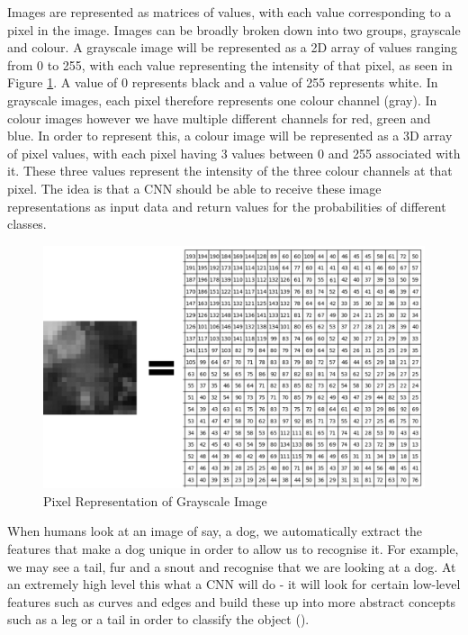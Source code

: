 \documentclass[12pt]{report}
\begin{document}
\begin{flushleft}
Images are represented as matrices of values, with each value corresponding to a pixel in the image. Images can be broadly broken down into two groups, grayscale and colour. A grayscale image will be represented as a 2D array of values ranging from 0 to 255, with each value representing the intensity of that pixel, as seen in Figure \ref{fig:pixels}. A value of 0 represents black and a value of 255 represents white. In grayscale images, each pixel therefore represents one colour channel (gray). In colour images however we have multiple different channels for red, green and blue. In order to represent this, a colour image will be represented as a 3D array of pixel values, with each pixel having 3 values between 0 and 255 associated with it. These three values represent the intensity of the three colour channels at that pixel. The idea is that a CNN should be able to receive these image representations as input data and return values for the probabilities of different classes.
\end{flushleft}

\vspace{0.5cm}
\begin{figure}[ht!]
	\centering
	\includegraphics[width=12cm]{pixels}
	\caption{Pixel Representation of Grayscale Image}
	\label{fig:pixels}
\end{figure}

\begin{flushleft}
When humans look at an image of say, a dog, we automatically extract the features that make a dog unique in order to allow us to recognise it. For example, we may see a tail, fur and a snout and recognise that we are looking at a dog. At an extremely high level this what a CNN will do - it will look for certain low-level features such as curves and edges and build these up into more abstract concepts such as a leg or a tail in order to classify the object (\cite{lecun1995convolutional}).
\end{flushleft}
\end{document}
